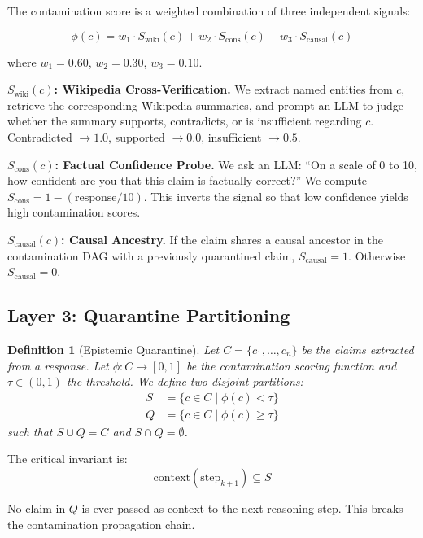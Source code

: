 \documentclass[11pt,a4paper]{article}
\newtheorem{definition}{Definition}
\begin{document}
The contamination score is a weighted combination of three independent signals:

\begin{equation}
\phi(c) = w_1 \cdot S_{\text{wiki}}(c) + w_2 \cdot S_{\text{cons}}(c) + w_3 \cdot S_{\text{causal}}(c)
\end{equation}

where $w_1 = 0.60$, $w_2 = 0.30$, $w_3 = 0.10$.

\textbf{$S_{\text{wiki}}(c)$: Wikipedia Cross-Verification.} We extract named entities from $c$, retrieve the corresponding Wikipedia summaries, and prompt an LLM to judge whether the summary supports, contradicts, or is insufficient regarding $c$. Contradicted $\to 1.0$, supported $\to 0.0$, insufficient $\to 0.5$.

\textbf{$S_{\text{cons}}(c)$: Factual Confidence Probe.} We ask an LLM: ``On a scale of 0 to 10, how confident are you that this claim is factually correct?'' We compute $S_{\text{cons}} = 1 - (\text{response}/10)$. This inverts the signal so that low confidence yields high contamination scores.

\textbf{$S_{\text{causal}}(c)$: Causal Ancestry.} If the claim shares a causal ancestor in the contamination DAG with a previously quarantined claim, $S_{\text{causal}} = 1$. Otherwise $S_{\text{causal}} = 0$.

\subsection{Layer 3: Quarantine Partitioning}

\begin{definition}[Epistemic Quarantine]
Let $C = \{c_1, \ldots, c_n\}$ be the claims extracted from a response. Let $\phi: C \to [0,1]$ be the contamination scoring function and $\tau \in (0,1)$ the threshold. We define two disjoint partitions:
\begin{align}
S &= \{c \in C \mid \phi(c) < \tau\} \\
Q &= \{c \in C \mid \phi(c) \geq \tau\}
\end{align}
such that $S \cup Q = C$ and $S \cap Q = \emptyset$.
\end{definition}

The critical invariant is:
\[
\text{context}(\text{step}_{k+1}) \subseteq S
\]

No claim in $Q$ is ever passed as context to the next reasoning step. This breaks the contamination propagation chain.
\end{document}
